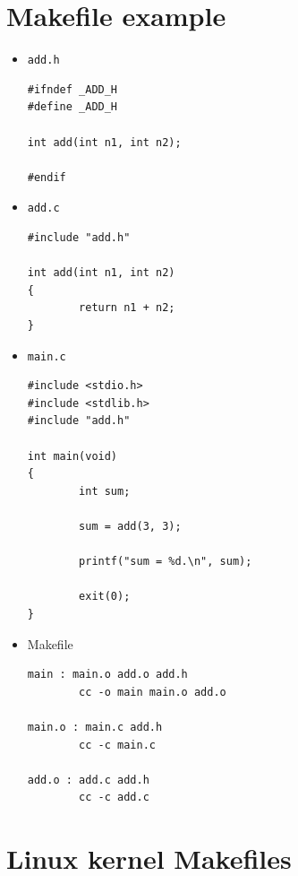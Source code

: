 \documentclass{beamer}
\begin{document}
\section{Makefile example}
\label{sec:makefiles}

\begin{frame}[fragile]
  \begin{itemize}
  \item \texttt{add.h}
\begin{lstlisting}
#ifndef _ADD_H
#define _ADD_H

int add(int n1, int n2);

#endif
\end{lstlisting}
  \item \texttt{add.c}
\begin{lstlisting}
#include "add.h"

int add(int n1, int n2)
{
        return n1 + n2;
}
\end{lstlisting}
  \end{itemize}
\end{frame}

\begin{frame}[fragile]
  \begin{itemize}
  \item \texttt{main.c}
\begin{lstlisting}
#include <stdio.h>
#include <stdlib.h>
#include "add.h"

int main(void)
{
        int sum;

        sum = add(3, 3);

        printf("sum = %d.\n", sum);

        exit(0);
}
\end{lstlisting}
  \end{itemize}
\end{frame}

\begin{frame}[fragile]
  \begin{itemize}
  \item Makefile
\begin{lstlisting}
main : main.o add.o add.h
        cc -o main main.o add.o

main.o : main.c add.h
        cc -c main.c

add.o : add.c add.h
        cc -c add.c
\end{lstlisting}
  \end{itemize}
\end{frame}

\section{Linux kernel Makefiles}
\end{document}

